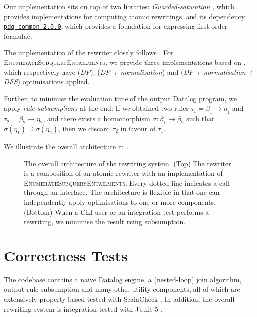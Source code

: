 \documentclass[12pt]{report}
\theoremstyle{plain}
\theoremstyle{definition}
\begin{document}
Our implementation sits on top of two libraries: \emph{Guarded-saturation} \cite{Benedikt_Rewriting_the_Infinite}, which provides implementations for computing atomic rewritings, and its dependency \href{https://github.com/ProofDrivenQuerying/pdq/releases/tag/v2.0.0}{\texttt{pdq-common-2.0.0}}, which provides a foundation for expressing first-order formulae.

The implementation of the rewriter closely follows . For \\ \textsc{EnumerateSubqueryEntailments}, we provide three implementations based on , which respectively have (\emph{DP}), (\emph{DP + normalisation}) and (\emph{DP + normalisation + DFS}) optimisations applied.

Further, to minimise the evaluation time of the output Datalog program, we apply \emph{rule subsumptions} at the end: If we obtained two rules $\tau_1 = \beta_1 \rightarrow \eta_1$ and $\tau_2 = \beta_2 \rightarrow \eta_2$, and there exists a homomorphism $\sigma: \beta_1 \rightarrow \beta_2$ such that $\sigma(\eta_1) \supseteq \sigma(\eta_2)$, then we discard $\tau_2$ in favour of $\tau_1$.

We illustrate the overall architecture in .

\begin{figure}[h]
\centering

\caption{The overall architecture of the rewriting system. (Top) The rewriter is a composition of an atomic rewriter with an implementation of \textsc{EnumerateSubqueryEntailments}. Every dotted line indicates a call through an interface. The architecture is flexible in that one can independently apply optimisations to one or more components. (Bottom) When a CLI user or an integration test performs a rewriting, we minimise the result using subsumption.}
\label{figure:implementation-architecture}
\end{figure}

\section{Correctness Tests}
\label{section:correctness-tests}

The codebase contains a naive Datalog engine, a (nested-loop) join algorithm, output rule subsumption and many other utility components, all of which are extensively property-based-tested with ScalaCheck \cite{scalacheck}. In addition, the overall rewriting system is integration-tested with JUnit 5 \cite{junit}.
\end{document}
